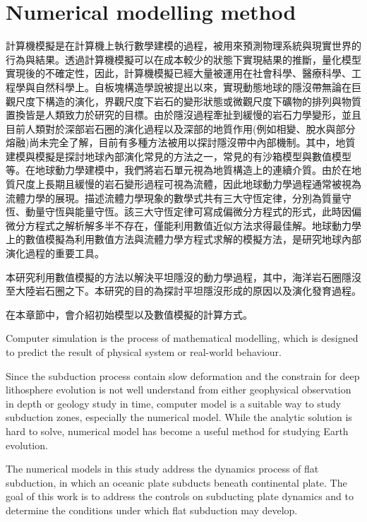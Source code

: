 
\chapter{Numerical modelling method}


計算機模擬是在計算機上執行數學建模的過程，被用來預測物理系統與現實世界的行為與結果。透過計算機模擬可以在成本較少的狀態下實現結果的推斷，量化模型實現後的不確定性，因此，計算機模擬已經大量被運用在社會科學、醫療科學、工程學與自然科學上。自板塊構造學說被提出以來，實現動態地球的隱沒帶無論在巨觀尺度下構造的演化，界觀尺度下岩石的變形狀態或微觀尺度下礦物的排列與物質置換皆是人類致力於研究的目標。由於隱沒過程牽扯到緩慢的岩石力學變形，並且目前人類對於深部岩石圈的演化過程以及深部的地質作用(例如相變、脫水與部分熔融)尚未完全了解，目前有多種方法被用以探討隱沒帶中內部機制。其中，地質建模與模擬是探討地球內部演化常見的方法之一，常見的有沙箱模型與數值模型等。在地球動力學建模中，我們將岩石單元視為地質構造上的連續介質。由於在地質尺度上長期且緩慢的岩石變形過程可視為流體，因此地球動力學過程通常被視為流體力學的展現。描述流體力學現象的數學式共有三大守恆定律，分別為質量守恆、動量守恆與能量守恆。該三大守恆定律可寫成偏微分方程式的形式，此時因偏微分方程式之解析解多半不存在，僅能利用數值近似方法求得最佳解。地球動力學上的數值模擬為利用數值方法與流體力學方程式求解的模擬方法，是研究地球內部演化過程的重要工具。

本研究利用數值模擬的方法以解決平坦隱沒的動力學過程，其中，海洋岩石圈隱沒至大陸岩石圈之下。本研究的目的為探討平坦隱沒形成的原因以及演化發育過程。

在本章節中，會介紹初始模型以及數值模擬的計算方式。

Computer simulation is the process of mathematical modelling, which is designed to predict the result of physical system or real-world behaviour. 

Since the subduction process contain slow deformation and the constrain for deep lithosphere evolution is not well understand from either geophysical observation in depth or geology study in time, computer model is a suitable way to study subduction zones, especially the numerical model. While the analytic solution is hard to solve, numerical model has become a useful method for studying Earth evolution. 

The numerical models in this study address the dynamics process of flat subduction, in which an oceanic plate subducts beneath continental plate. The goal of this work is to address the controls on subducting plate dynamics and to determine the conditions under which flat subduction may develop. 

